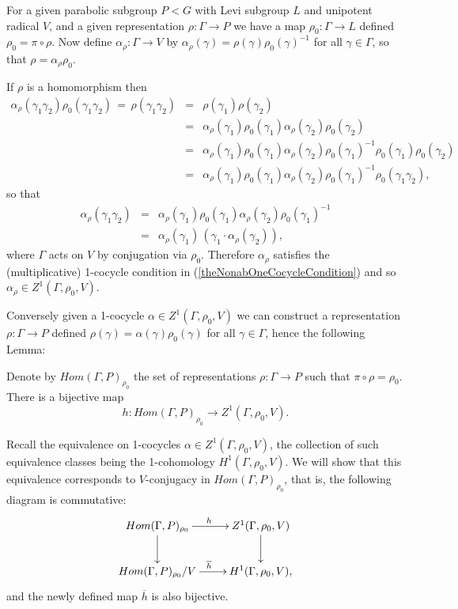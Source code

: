 For a given parabolic subgroup $P<G$ with Levi subgroup $L$ and unipotent radical $V$, and a given representation $\rho:\Gamma\rightarrow P$ we have a map $\rho_0:\Gamma\rightarrow L$ defined $\rho_0 = \pi \circ \rho$. Now define $\alpha_\rho:\Gamma\rightarrow V$ by $\alpha_\rho(\gamma) = \rho(\gamma)\rho_0(\gamma)^{-1}$ for all $\gamma\in\Gamma$, so that $\rho = \alpha_\rho\rho_0$.

If $\rho$ is a homomorphism then
\begin{eqnarray*}
	\alpha_\rho(\gamma_1\gamma_2)\rho_0(\gamma_1\gamma_2) \,=\, \rho(\gamma_1\gamma_2) 
		&=& \rho(\gamma_1)\rho(\gamma_2) \\
		&=& \alpha_\rho(\gamma_1)\rho_0(\gamma_1)\alpha_\rho(\gamma_2)\rho_0(\gamma_2) \\
		&=& \alpha_\rho(\gamma_1)\rho_0(\gamma_1)\alpha_\rho(\gamma_2)\rho_0(\gamma_1)^{-1}\rho_0(\gamma_1)\rho_0(\gamma_2)\\
		&=&\alpha_\rho(\gamma_1)\rho_0(\gamma_1)\alpha_\rho(\gamma_2)\rho_0(\gamma_1)^{-1}\rho_0(\gamma_1\gamma_2),
\end{eqnarray*}
so that
\begin{eqnarray*}
	\alpha_\rho(\gamma_1\gamma_2) &=&
	\alpha_\rho(\gamma_1)\rho_0(\gamma_1)\alpha_\rho(\gamma_2)\rho_0(\gamma_1)^{-1}\\
	&=& \alpha_\rho(\gamma_1)\,\left(\gamma_1\cdot\alpha_\rho(\gamma_2)\right),
\end{eqnarray*}
where $\Gamma$ acts on $V$ by conjugation via $\rho_0$. Therefore $\alpha_\rho$ satisfies the (multiplicative) 1-cocycle condition in (\ref{theNonabOneCocycleCondition}) and so $\alpha_\rho\in Z^1(\Gamma, \rho_0, V)$. 

Conversely given a 1-cocycle $\alpha\in Z^1(\Gamma, \rho_0, V)$ we can construct a representation $\rho:\Gamma\rightarrow P$ defined $\rho(\gamma) = \alpha(\gamma)\rho_0(\gamma)$ for all $\gamma\in \Gamma$, hence the following Lemma:

\begin{lemma}\label{bijCor} Denote by $Hom(\Gamma, P)_{\rho_0}$ the set of representations $\rho:\Gamma\rightarrow P$ such that $\pi\circ\rho = \rho_0$. There is a bijective map
	\begin{displaymath}
		h:Hom(\Gamma, P)_{\rho_0} \rightarrow Z^1(\Gamma, \rho_0, V).
	\end{displaymath}
\end{lemma}

Recall the equivalence on 1-cocycles $\alpha\in Z^1(\Gamma, \rho_0, V)$, the collection of such equivalence classes being the 1-cohomology $H^1(\Gamma, \rho_0, V)$. We will show that this equivalence corresponds to $V$-conjugacy in $Hom(\Gamma, P)_{\rho_0}$, that is, the following diagram is commutative:
\begin{displaymath}
	\xymatrix{
		Hom(\Gamma, P)_{\rho_0} \ar[r]^h \ar[d] & Z^1(\Gamma, \rho_0, V)\ar[d] \\
		Hom(\Gamma, P)_{\rho_0}/V \ar[r]^{\overline{h}} & H^1(\Gamma, \rho_0, V),
	}
\end{displaymath}
and the newly defined map $\overline{h}$ is also bijective.

